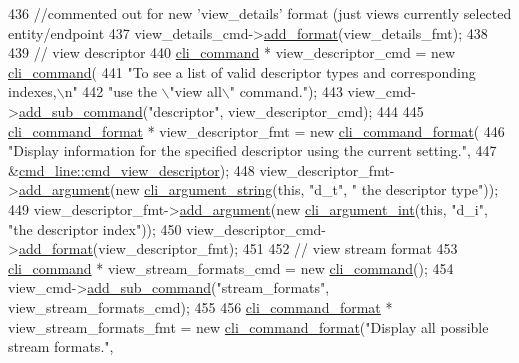 \begin{DoxyCode}
436     \textcolor{comment}{//commented out for new 'view\_details' format (just views currently selected entity/endpoint}
437     view\_details\_cmd->\hyperlink{classcli__command_aa9ec38e761644d946f8db2b920e39921}{add\_format}(view\_details\_fmt);
438 
439     \textcolor{comment}{// view descriptor}
440     \hyperlink{classcli__command}{cli\_command} * view\_descriptor\_cmd = \textcolor{keyword}{new} \hyperlink{classcli__command}{cli\_command}(
441         \textcolor{stringliteral}{"To see a list of valid descriptor types and corresponding indexes,\(\backslash\)n"}
442         \textcolor{stringliteral}{"use the \(\backslash\)"view all\(\backslash\)" command."});
443     view\_cmd->\hyperlink{classcli__command_aa73a67e8ebb6facd4b40ced66279b226}{add\_sub\_command}(\textcolor{stringliteral}{"descriptor"}, view\_descriptor\_cmd);
444 
445     \hyperlink{classcli__command__format}{cli\_command\_format} * view\_descriptor\_fmt = \textcolor{keyword}{new} 
      \hyperlink{classcli__command__format}{cli\_command\_format}(
446         \textcolor{stringliteral}{"Display information for the specified descriptor using the current setting."},
447         &\hyperlink{classcmd__line_abfd19a6de59d0ed6976c58b29253c403}{cmd\_line::cmd\_view\_descriptor});
448     view\_descriptor\_fmt->\hyperlink{classcli__command__format_ac3fc6d13a227c195d5ee6f7b78eba9cd}{add\_argument}(\textcolor{keyword}{new} \hyperlink{classcli__argument__string}{cli\_argument\_string}(\textcolor{keyword}{this}, \textcolor{stringliteral}{"d\_t"}, \textcolor{stringliteral}{"
      the descriptor type"}));
449     view\_descriptor\_fmt->\hyperlink{classcli__command__format_ac3fc6d13a227c195d5ee6f7b78eba9cd}{add\_argument}(\textcolor{keyword}{new} \hyperlink{classcli__argument__int}{cli\_argument\_int}(\textcolor{keyword}{this}, \textcolor{stringliteral}{"d\_i"}, \textcolor{stringliteral}{"the
       descriptor index"}));
450     view\_descriptor\_cmd->\hyperlink{classcli__command_aa9ec38e761644d946f8db2b920e39921}{add\_format}(view\_descriptor\_fmt);
451 
452     \textcolor{comment}{// view stream format}
453     \hyperlink{classcli__command}{cli\_command} * view\_stream\_formats\_cmd = \textcolor{keyword}{new} \hyperlink{classcli__command}{cli\_command}();
454     view\_cmd->\hyperlink{classcli__command_aa73a67e8ebb6facd4b40ced66279b226}{add\_sub\_command}(\textcolor{stringliteral}{"stream\_formats"}, view\_stream\_formats\_cmd);
455 
456     \hyperlink{classcli__command__format}{cli\_command\_format} * view\_stream\_formats\_fmt = \textcolor{keyword}{new} 
      \hyperlink{classcli__command__format}{cli\_command\_format}(\textcolor{stringliteral}{"Display all possible stream formats."},

\end{DoxyCode}
